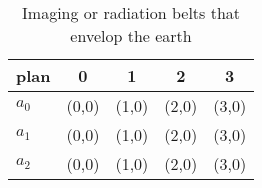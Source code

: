 \documentclass[a4paper]{article}
\begin{document}
\begin{table}
\begin{adjustbox}{width=0.5\columnwidth}
\begin{tabular}{|l|l|l|l|l|}
\hline
\textbf{plan} & \multicolumn{1}{c|}{\textbf{0}} & \multicolumn{1}{c|}{\textbf{1}} & \multicolumn{1}{c|}{\textbf{2}} & \multicolumn{1}{c|}{\textbf{3}} \\ \hline
\textbf{$a_0$}  & (0,0) & (1,0) & (2,0) & (3,0) \\ \hline
\textbf{$a_1$}  & (0,0) & (1,0) & (2,0) & (3,0) \\ \hline
\textbf{$a_2$}  & (0,0) & (1,0) & (2,0) & (3,0) \\ \hline
\end{tabular}
\end{adjustbox}
\caption{Imaging or radiation belts that envelop the earth
}
\end{table}
\end{document}
